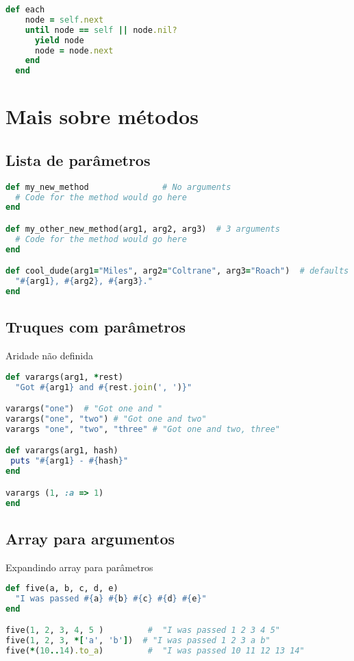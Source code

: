 \documentclass[serif,mathserif]{book}
\begin{document}
\begin{lstlisting}[language=ruby]
  def each
    node = self.next
    until node == self || node.nil?
      yield node
      node = node.next
    end
  end

\end{lstlisting}



\chapter{Mais sobre métodos}

\section{Lista de parâmetros}

\begin{lstlisting}[language=ruby]
def my_new_method               # No arguments
  # Code for the method would go here
end

def my_other_new_method(arg1, arg2, arg3)  # 3 arguments
  # Code for the method would go here
end

def cool_dude(arg1="Miles", arg2="Coltrane", arg3="Roach")  # defaults
  "#{arg1}, #{arg2}, #{arg3}."
end
\end{lstlisting}

\section{Truques com parâmetros}

Aridade não definida

\begin{lstlisting}[language=ruby]
def varargs(arg1, *rest)
  "Got #{arg1} and #{rest.join(', ')}"

varargs("one")  # "Got one and "
varargs("one", "two") # "Got one and two"
varargs "one", "two", "three" # "Got one and two, three"

def varargs(arg1, hash)
 puts "#{arg1} - #{hash}"
end

varargs (1, :a => 1)
end
\end{lstlisting}

\section{Array para argumentos}

Expandindo array para parâmetros

\begin{lstlisting}[language=ruby]
def five(a, b, c, d, e)
  "I was passed #{a} #{b} #{c} #{d} #{e}"
end

five(1, 2, 3, 4, 5 )         #  "I was passed 1 2 3 4 5"
five(1, 2, 3, *['a', 'b'])  # "I was passed 1 2 3 a b"
five(*(10..14).to_a)         #  "I was passed 10 11 12 13 14"
\end{lstlisting}
\end{document}
